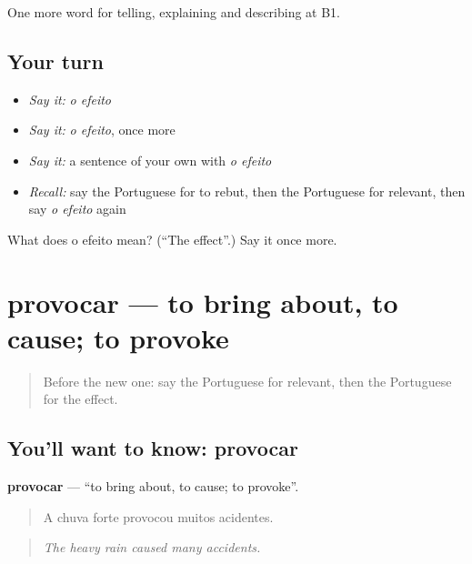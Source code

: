 \begin{grammarlens}[title={What you've built}]
One more word for telling, explaining and describing at B1.
\end{grammarlens}

\subsection*{Your turn}
\begin{itemize}
\raggedright
  \item \emph{Say it:} \emph{o efeito}
  \item \emph{Say it:} \emph{o efeito}, once more
  \item \emph{Say it:} a sentence of your own with \emph{o efeito}
  \item \emph{Recall:} say the Portuguese for to rebut, then the Portuguese for relevant, then say \emph{o efeito} again
\end{itemize}

\begin{tcolorbox}[breakable,colback=teal!4,colframe=teal!35!black,title={Before you move on}]
What does o efeito mean? (\textquotedblleft{}The effect\textquotedblright{}.) Say it once more.
\end{tcolorbox}
\section[provocar]{provocar — to bring about, to cause; to provoke}

\label{lesson:PT-C348-provocar}



\begin{quote}
Before the new one: say the Portuguese for relevant, then the Portuguese for the effect.
\end{quote}

\subsection*{You'll want to know: provocar}
\textbf{provocar} — \textquotedblleft{}to bring about, to cause; to provoke\textquotedblright{}.

\begin{quote}
A chuva forte provocou muitos acidentes.
\end{quote}

\begin{quote}
\emph{The heavy rain caused many accidents.}
\end{quote}

